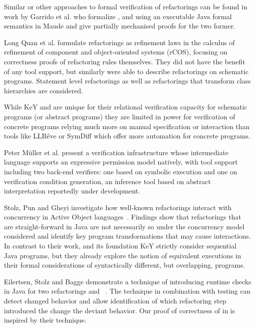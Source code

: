 Similar or other approaches to formal verification of refactorings can be found in work by
Garrido et al. \cite{garrido2006formal} who formalize ,
 and  using an executable
Java formal semantics in Maude and give partially mechanised proofs for the two former.

Long Quan et al. \cite{DBLP:conf/isola/QuanQL08} formulate refactorings as refinement
laws in the calculus of refinement of component and object-oriented systems (rCOS),
focusing on correctness proofs of refactoring rules themselves.
They did not have the benefit of any tool support, but similarly were able to describe
refactorings on schematic programs.
Statement level refactorings as well as refactorings that transform class hierarchies are considered.

While KeY and \Refinity{} are unique for their relational verification capacity for
schematic programs (or abstract programs) they are limited in power for verification
of concrete programs relying much more on manual specification or interaction \cite{DBLP:conf/aplas/Steinhofel20}
than tools like LLRêve \cite{DBLP:journals/jar/KieferKU18} or SymDiff \cite{DBLP:conf/cav/LahiriHKR12}
which offer more automation for concrete programs.

Peter M{\"u}ller et al. \cite{DBLP:series/natosec/0001SS17} present a verification infrastructure whose intermediate language supports
an expressive permission model natively, with tool support including two back-end verifiers: one based on
symbolic execution and one on verification condition generation, an inference tool based on abstract
interpretation reportedly under development.

Stolz, Pun and Gheyi investigate how well-known refactorings interact with concurrency in Active Object languages~\cite{DBLP:conf/isola/StolzPG20}.
Findings show that refactorings that are straight-forward in Java are not necessarily so under the concurrency model considered and identify key
program transformations that may cause interactions.
In contrast to their work, \Refinity{} and its foundation KeY strictly consider sequential Java programs,
but they already explore the notion of equivalent executions in their formal considerations of syntactically different, but overlapping, programs.

Eilertsen, Stolz and Bagge demonstrate a technique of introducing runtime checks in Java for two refactorings  and
~\cite{stolz:isolarefa}. The technique in combination with testing can detect changed behavior and allow identification
of which refactoring step introduced the change the deviant behavior.
Our proof of correctness of  in \Refinity{} is inspired by their technique.



